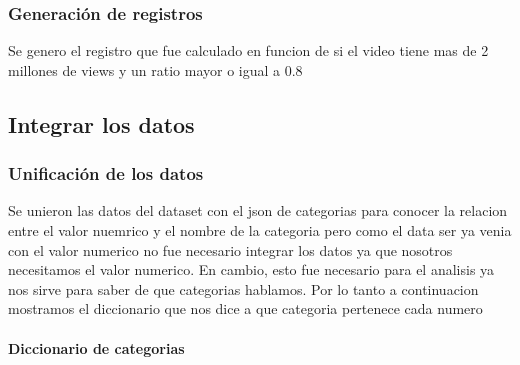     \subsubsection{Generación de registros}
        Se genero el registro  que fue calculado en funcion de si
        el video tiene mas de 2 millones de views y un ratio mayor o igual a 0.8

\subsection{Integrar los datos}
    \subsubsection{Unificación de los datos}

        Se unieron las datos del dataset con el json de categorias para conocer
        la relacion entre el valor nuemrico y el nombre de la categoria pero como
        el data ser ya venia con el valor numerico no fue necesario integrar los
        datos ya que nosotros necesitamos el valor numerico. En cambio, esto fue
        necesario para el analisis ya nos sirve para saber de que categorias
        hablamos. Por lo tanto a continuacion mostramos el diccionario que nos
        dice a que categoria pertenece cada numero\\
        \newpage
        \paragraph{Diccionario de categorias}


